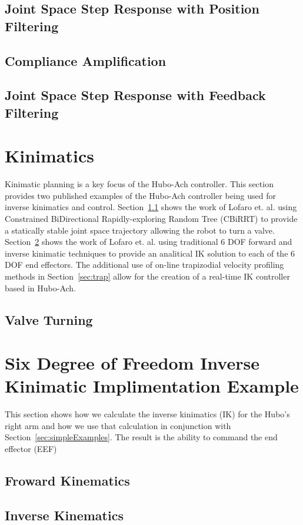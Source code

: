 	\subsection{Joint Space Step Response with Position Filtering}\label{sec:singlejointFilter}
		
	\subsection{Compliance Amplification}\label{sec:singlejointRefComplience}
		
	\subsection{Joint Space Step Response with Feedback Filtering}\label{sec:singlejointEnc}
		

\section{Kinimatics}
Kinimatic planning is a key focus of the Hubo-Ach controller.
This section provides two published examples of the Hubo-Ach controller being used for inverse kinimatics and control.
Section~\ref{sec:valve} shows the work of Lofaro et. al. \cite{lofaroTePRA2013Valve} using Constrained BiDirectional Rapidly-exploring Random Tree (CBiRRT) to provide a statically stable joint space trajectory allowing the robot to turn a valve.
Section~\ref{sec:6dofik} shows the work of Lofaro et. al. \cite{lofaroTePRA2013HuboAch} using traditional 6 DOF forward and inverse kinimatic techniques to provide an analitical IK solution to each of the 6 DOF end effectors.
The additional use of on-line trapizodial velocity profiling methods in Section~\ref{sec:trap} allow for the creation of a real-time IK controller based in Hubo-Ach.


\subsection{Valve Turning}\label{sec:valve}
	



\section{Six Degree of Freedom Inverse Kinimatic Implimentation Example}\label{sec:6dofik}
This section shows how we calculate the inverse kinimatics (IK) for the Hubo's right arm and how we use that calculation in conjunction with Section~\ref{sec:simpleExamples}.  The result is the ability to command the end effector (EEF)


	\subsection{Froward Kinematics} 
		
	\subsection{Inverse Kinematics}\label{sec:ik}
			
